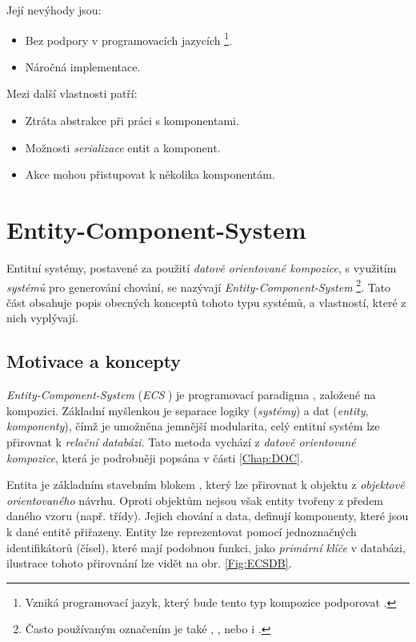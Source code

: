 \noindent Její nevýhody jsou: 
\begin{itemize}
	\item Bez podpory v programovacích jazycích \footnote{Vzniká programovací jazyk, který bude tento typ kompozice podporovat \cite{OOHLang}.}.
	\item Náročná implementace.
\end{itemize}

\pagebreak

\noindent Mezi další vlastnosti patří:
\begin{itemize}
	\item Ztráta abstrakce při práci s komponentami.
	\item Možnosti \emph{serializace} entit a komponent.
	\item Akce mohou přistupovat k několika komponentám.
\end{itemize}

\section{Entity-Component-System}
\label{Chap:EntitySystem} 

Entitní systémy, postavené za použití \emph{datově orientované kompozice}, s využitím \emph{systémů} pro generování chování, se nazývají \emph{Entity-Component-System}  \footnote{Často používaným označením je také ,  , nebo i .}. Tato část obsahuje popis obecných konceptů tohoto typu systémů, a vlastností, které z nich vyplývají.

\subsection{Motivace a koncepty}

\emph{Entity-Component-System} (\emph{ECS} \cite{WhatIsECS} \cite{UnderstandingECS}) je programovací paradigma \cite{EntitySystemsFuture}, založené na kompozici. Základní myšlenkou je separace logiky (\emph{systémy}) a dat (\emph{entity}, \emph{komponenty}), čímž je umožněna jemnější modularita, celý entitní systém lze přirovnat k \emph{relační databázi}. Tato metoda vychází z \emph{datově orientované kompozice}, která je podrobněji popsána v části \ref{Chap:DOC}. 

Entita je základním stavebním blokem \cite{EntitySystemsFuture}, který lze přirovnat k objektu z \emph{objektově orientovaného} návrhu. Oproti objektům nejsou však entity tvořeny z předem daného vzoru (např. třídy). Jejich chování a data, definují komponenty, které jsou k dané entitě přiřazeny. Entity lze reprezentovat pomocí jednoznačných identifikátorů (čísel), které mají podobnou funkci, jako \emph{primární klíče} v databázi, ilustrace tohoto přirovnání lze vidět na obr. \ref{Fig:ECSDB}.

